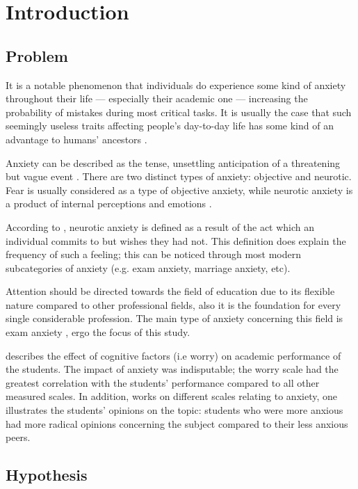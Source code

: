 \documentclass[12pt]{report}
\begin{document}
\chapter{Introduction}
\setcounter{page}{2}
\begin{multicols}{2}
\section{Problem}

It is a notable phenomenon that individuals do experience some kind of anxiety
throughout their life — especially their academic one — increasing the
probability of mistakes during most critical tasks. It is usually the case that
such seemingly useless traits affecting people's day-to-day life has some kind
of an advantage to humans' ancestors \parencite{Price2003-bl}. 

Anxiety can be described as the tense, unsettling anticipation of a threatening
but vague event \parencite{Rachman2019-cn}. There are two distinct types of
anxiety: objective and neurotic. Fear is usually considered as a type of
objective anxiety, while neurotic anxiety is a product of internal perceptions
and emotions \parencite{Spielberger1966-dk}. 

According to \cite{mowrer1939stimulus}, neurotic anxiety is defined as a result
of the act which an individual commits to but wishes they had not. This
definition does explain the frequency of such a feeling; this can be noticed
through most modern subcategories of anxiety (e.g. exam anxiety, marriage
anxiety, etc).

Attention should be directed towards the field of education due to its flexible
nature compared to other professional fields, also it is the foundation for
every single considerable profession. The main type of anxiety concerning this
field is exam anxiety \parencite{academic-anxiety}, ergo the focus of this study.

\cite{rana_2010_the} describes the effect of cognitive factors (i.e worry) on
academic performance of the students. The impact of anxiety was indisputable;
the worry scale had the greatest correlation with the students' performance
compared to all other measured scales. In addition, \cite{trifoni2011does} works
on different scales relating to anxiety, one illustrates the students'
opinions on the topic: students who were more anxious had more radical opinions
concerning the subject compared to their less anxious peers.

\section{Hypothesis}


\end{multicols}
\end{document}
